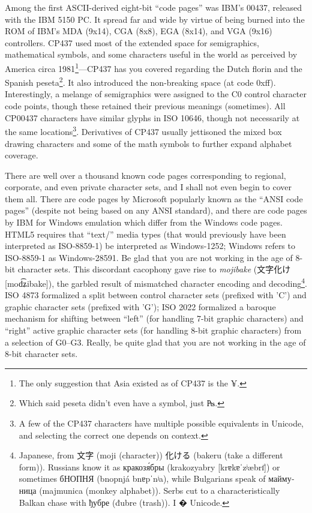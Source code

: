 Among the first ASCII-derived eight-bit ``code pages'' was IBM's 00437, released
with the IBM 5150 PC. It spread far and wide by virtue of being burned into the
ROM of IBM's MDA (9x14), CGA (8x8), EGA (8x14), and VGA (9x16) controllers.
CP437 used most of the extended space for semigraphics, mathematical symbols,
and some characters useful in the world as perceived by America circa 1981\footnote{The
 only suggestion that Asia existed as of CP437 is the ¥.}---CP437 has you
covered regarding the Dutch florin and the Spanish peseta\footnote{Which said
peseta didn't even have a symbol, just ₧.}. It also introduced
the non-breaking space (at code 0xff). Interestingly, a melange of semigraphics
were assigned to the C0 control character code points, though these retained
their previous meanings (sometimes). All CP00437 characters have similar
glyphs in ISO 10646, though not necessarily at the same locations\footnote{A few
of the CP437 characters have multiple possible equivalents in Unicode, and
selecting the correct one depends on context.}. Derivatives of CP437
usually jettisoned the mixed box drawing characters and some of the math
symbols to further expand alphabet coverage.

There are well over a thousand known code pages corresponding to regional,
corporate, and even private character sets, and I shall not even begin to
cover them all. There are code pages by Microsoft popularly known as the ``ANSI
code pages'' (despite not being based on any ANSI standard), and there are code
pages by IBM for Windows emulation which differ from the Windows code pages.
HTML5 requires that ``text/'' media types (that would previously have been interpreted
as ISO-8859-1) be interpreted as Windows-1252; Windows refers to
ISO-8859-1 as Windows-28591. Be glad that you are not working in the age of
8-bit character sets. This discordant cacophony gave rise to \textit{mojibake}
(文字化け [{mod͡ʑibake}]), the garbled result of
mismatched character encoding and decoding\footnote{Japanese, from 文字 (moji
(character)) 化ける (bakeru (take a different form)). Russians know it as
\textrussian{кракозя́бры} (krakozyabry [{krɐkɐˈzʲæbrɪ̈}]) or sometimes \textrussian{бНОПНЯ} (bnopnjá
{bnɐpˈnʲa}), while Bulgarians speak of
\textbulgarian{маймуница} (majmunica (monkey alphabet)). Serbs cut to a
characteristically Balkan chase with \textrussian{ђубре} (đubre (trash)). I
{�} Unicode.}. ISO 4873\cite{iso4873} formalized a
split between control character sets (prefixed with 'C') and graphic character
sets (prefixed with 'G'); ISO 2022 formalized a baroque mechanism for shifting
between ``left'' (for handling 7-bit graphic characters) and ``right'' active
graphic character sets (for handling 8-bit graphic characters) from a selection
of G0--G3. Really, be quite glad that you are not working in the age of 8-bit
character sets.

